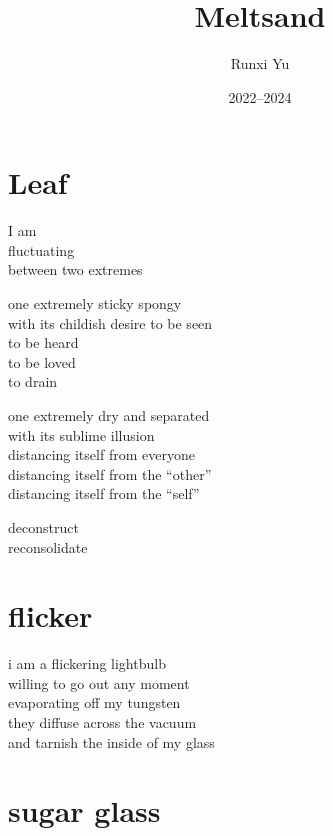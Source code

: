 \documentclass[parskip=full,12pt,oneside,a5paper]{scrbook}
\begin{document}
\title{Meltsand}
\author{Runxi Yu}
\date{2022--2024}
\maketitle
\tableofcontents

\chapter{Leaf}

I am\\
\hphantom{I am} fluctuating\\
\hphantom{I am fluctuating} between two extremes

one extremely sticky spongy\\
\hspace*{2em}with its childish desire to be seen\\
\hspace*{4em}to be heard\\
\hspace*{6em}to be loved\\
\hspace*{8em}to drain

one extremely dry and separated\\
\hspace*{2em}with its sublime illusion\\
\hspace*{4em}distancing itself from everyone\\
\hspace*{6em}distancing itself from the ``other''\\
\hspace*{8em}distancing itself from the ``self''

deconstruct\\
reconsolidate

\chapter{flicker}

i am a flickering lightbulb\\
willing to go out any moment\\
evaporating off my tungsten\\
they diffuse across the vacuum\\
and tarnish the inside of my glass

\chapter{sugar glass}
\end{document}
